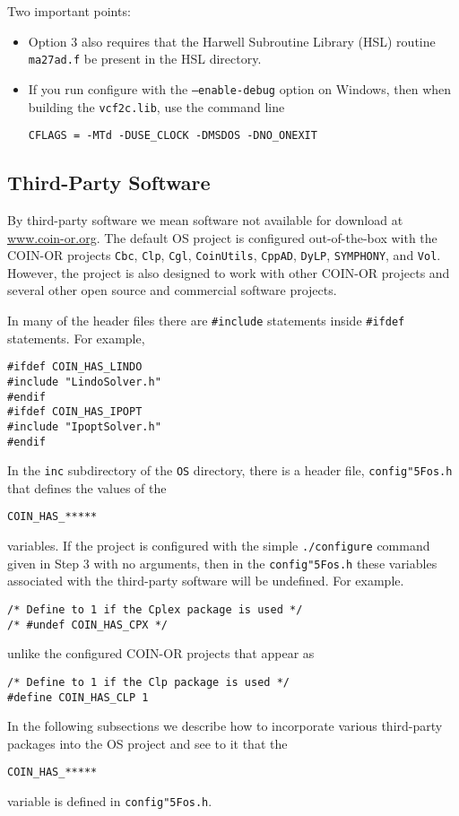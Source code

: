\documentclass[11pt]{article}
\renewcommand{\_}{{\char"5F}}
\renewcommand{\{}{{\char"7B}}
\renewcommand{\}}{{\char"7D}}
\renewcommand{\^}{{\char"0D}}
\renewcommand{\'}{{\char"0D}}
\begin{document}
Two important points:


\begin{itemize}
\item Option 3 also requires that the  Harwell Subroutine Library (HSL) routine {\tt ma27ad.f} be present in the HSL directory. 

\item If you run configure with the {\tt --enable-debug} option on Windows, then when building the {\tt vcf2c.lib}, use the command line

\begin{verbatim}
CFLAGS = -MTd -DUSE_CLOCK -DMSDOS -DNO_ONEXIT
\end{verbatim}

\end{itemize} 





\subsection{Third-Party Software}

By third-party software we mean software not available for download at \url{www.coin-or.org}. The default OS project is configured out-of-the-box with the COIN-OR  projects {\tt Cbc}, {\tt Clp}, {\tt Cgl}, {\tt CoinUtils}, {\tt CppAD},  {\tt DyLP}, {\tt SYMPHONY}, and {\tt Vol}.  However, the project is also designed to work with other COIN-OR projects and several other open source and commercial software projects.  

In many of the header files there are {\tt \#include} statements inside {\tt  \#ifdef}  statements. For example,
\begin{verbatim}
#ifdef COIN_HAS_LINDO    
#include "LindoSolver.h"
#endif  
#ifdef COIN_HAS_IPOPT    
#include "IpoptSolver.h"
#endif 
\end{verbatim}
In the {\tt inc} subdirectory of the {\tt OS}  directory, there is a header file, {\tt config\_os.h} that defines the values of the  
\begin{verbatim}
COIN_HAS_*****
\end{verbatim}
variables. If the project is configured with the simple {\tt ./configure} command given in Step 3 with no arguments, then in the {\tt config\_os.h} these variables associated with the third-party software will be undefined. For example.
\begin{verbatim}
/* Define to 1 if the Cplex package is used */
/* #undef COIN_HAS_CPX */
\end{verbatim}
unlike the configured COIN-OR projects that appear as
\begin{verbatim}
/* Define to 1 if the Clp package is used */
#define COIN_HAS_CLP 1
\end{verbatim}
In the following subsections we  describe how to incorporate various  third-party packages into the OS project and see to it that the 
\begin{verbatim}
COIN_HAS_*****
\end{verbatim}
variable is defined in  {\tt config\_os.h}.
\end{document}
